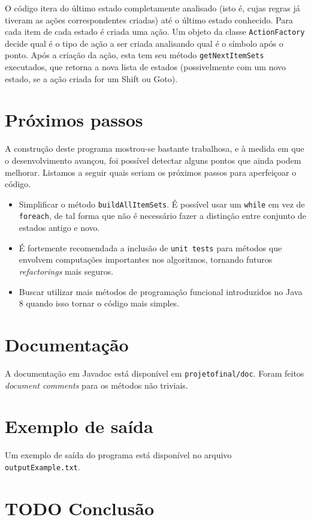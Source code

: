 \documentclass[11pt]{article}
\begin{document}
O código itera do último estado completamente analisado (isto é, cujas
regras já tiveram as ações correspondentes criadas) até o último estado conhecido.
Para cada item de cada estado é criada uma ação. Um objeto da classe
\texttt{ActionFactory} decide qual é o tipo de ação a ser criada analisando qual é o
símbolo após o ponto. Após a criação da ação, esta tem seu método
\texttt{getNextItemSets} executados, que retorna a nova lista de estados (possivelmente com
um novo estado, se a ação criada for um Shift ou Goto).

\section{Próximos passos}
\label{sec:orgheadline15}
A construção deste programa mostrou-se bastante trabalhosa, e à medida em que o
desenvolvimento avançou, foi possível detectar alguns pontos que ainda podem
melhorar. Listamos a seguir quais seriam os próximos passos para aperfeiçoar o código. 
\begin{itemize}
\item Simplificar o método \texttt{buildAllItemSets}. É possível usar um \texttt{while} em vez de
\texttt{foreach}, de tal forma que não é necessário fazer a distinção entre conjunto
de estados antigo e novo.
\item É fortemente recomendada a inclusão de \texttt{unit tests} para métodos que envolvem
computações importantes nos algoritmos, tornando futuros \emph{refactorings} mais seguros.
\item Buscar utilizar mais métodos de programação funcional introduzidos no Java 8
quando isso tornar o código mais simples.
\end{itemize}
\section{Documentação}
\label{sec:orgheadline16}
A documentação em Javadoc está disponível em \texttt{projetofinal/doc}. Foram feitos
\emph{document comments} para os métodos não triviais.
\section{Exemplo de saída}
\label{sec:orgheadline17}
Um exemplo de saída do programa está disponível no arquivo \texttt{outputExample.txt}.

\section{{\bfseries\sffamily TODO} Conclusão}
\label{sec:orgheadline18}
\end{document}
